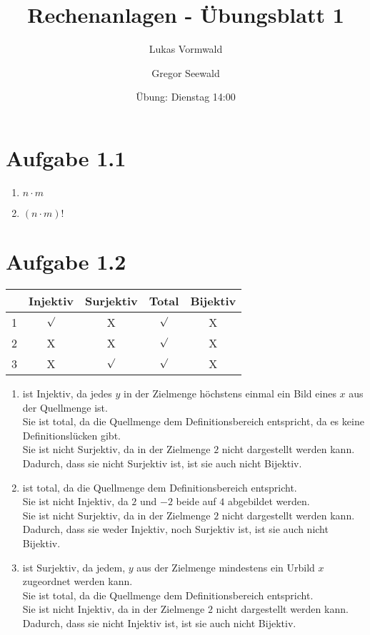 \documentclass[11pt,a4paper]{article}
\title{Rechenanlagen - Übungsblatt 1}
\author{Lukas Vormwald \and Gregor Seewald}
\date{Übung: Dienstag 14:00}
\begin{document}
\maketitle
	\section*{Aufgabe 1.1}
		\begin{enumerate}
			\item $n\cdot m$
			\item $\left( n \cdot m \right)!$
		\end{enumerate}
	\section*{Aufgabe 1.2}
	\begin{tabular}{|c|c|c|c|c|}
	\hline 
	 & Injektiv & Surjektiv & Total & Bijektiv \\ 
	\hline 
	1 & $\surd$ & X & $\surd$ & X \\ 
	\hline 
	2 & X & X & $\surd$ & X \\
	\hline
	3 & X & $\surd$ & $\surd$ & X \\
	\hline  
	\end{tabular} 
	\begin{enumerate}
		\item ist Injektiv, da jedes $y$ in der Zielmenge höchstens einmal ein Bild eines $x$ aus der Quellmenge ist.\\
		Sie ist total, da die Quellmenge dem Definitionsbereich entspricht, da es keine Definitionslücken gibt.\\
		 Sie ist nicht Surjektiv, da in der Zielmenge $2$ nicht dargestellt werden kann.\\
		   Dadurch, dass sie nicht Surjektiv ist, ist sie auch nicht Bijektiv.
		\item ist total, da die Quellmenge dem Definitionsbereich entspricht.\\
		 Sie ist nicht Injektiv, da $2$ und $-2$ beide auf $4$ abgebildet werden.\\
		 Sie ist nicht Surjektiv, da in der Zielmenge $2$ nicht dargestellt werden kann.\\
		 Dadurch, dass sie weder Injektiv, noch Surjektiv ist, ist sie auch nicht Bijektiv. 
		\item ist Surjektiv, da jedem, $y$ aus der Zielmenge  mindestens ein Urbild $x$ zugeordnet werden kann.\\
		Sie ist total, da die Quellmenge dem Definitionsbereich entspricht.\\
		Sie ist nicht Injektiv, da in der Zielmenge $2$ nicht dargestellt werden kann.\\
		Dadurch, dass sie nicht Injektiv ist, ist sie auch nicht Bijektiv.
	\end{enumerate}
\end{document}
